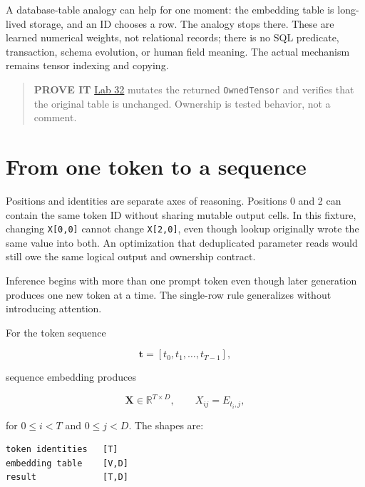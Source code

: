 A database-table analogy can help for one moment: the embedding table is
long-lived storage, and an ID chooses a row. The analogy stops there.
These are learned numerical weights, not relational records; there is no
SQL predicate, transaction, schema evolution, or human field meaning.
The actual mechanism remains tensor indexing and copying.

\begin{quote}
\textbf{PROVE IT}
\href{https://github.com/hermonai/inside-the-llm-engine/blob/astra-visual-rewrite/labs/lab-32-embedding-view-vs-copy.md}{Lab
32} mutates the returned \texttt{OwnedTensor} and verifies that the
original table is unchanged. Ownership is tested behavior, not a
comment.
\end{quote}

\section{From one token to a
sequence}\label{from-one-token-to-a-sequence}


Positions and identities are separate axes of reasoning. Positions 0 and
2 can contain the same token ID without sharing mutable output cells. In
this fixture, changing \texttt{X{[}0,0{]}} cannot change
\texttt{X{[}2,0{]}}, even though lookup originally wrote the same value
into both. An optimization that deduplicated parameter reads would still
owe the same logical output and ownership contract.

Inference begins with more than one prompt token even though later
generation produces one new token at a time. The single-row rule
generalizes without introducing attention.

For the token sequence

\begin{equation}
\mathbf{t}=[t_0,t_1,\ldots,t_{T-1}],
\end{equation}

sequence embedding produces

\begin{equation}
\mathbf{X}\in\mathbb{R}^{T\times D},
\qquad X_{ij}=E_{t_i,j},
\end{equation}

for \(0\le i<T\) and \(0\le j<D\). The shapes are:

\begin{verbatim}
token identities   [T]
embedding table    [V,D]
result             [T,D]
\end{verbatim}

